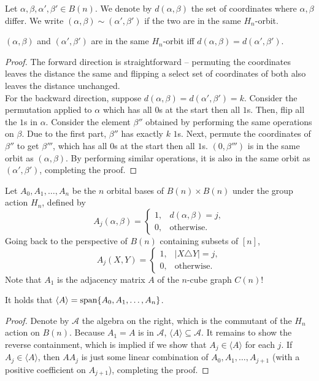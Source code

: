 	Let $\alpha,\beta,\alpha',\beta' \in B(n)$. We denote by $d(\alpha,\beta)$ the set of coordinates where $\alpha,\beta$ differ. We write $(\alpha,\beta) \sim (\alpha',\beta')$ if the two are in the same $H_n$-orbit.

	\begin{flem}
		$(\alpha,\beta)$ and $(\alpha',\beta')$ are in the same $H_n$-orbit iff $d(\alpha,\beta) = d(\alpha',\beta')$.
	\end{flem}
	\begin{proof}
		The forward direction is straightforward -- permuting the coordinates leaves the distance the same and flipping a select set of coordinates of both also leaves the distance unchanged.\\
		For the backward direction, suppose $d(\alpha,\beta) = d(\alpha',\beta') = k$. Consider the permutation applied to $\alpha$ which has all $0$s at the start then all $1$s. Then, flip all the $1$s in $\alpha$. Consider the element $\beta''$ obtained by performing the same operations on $\beta$. Due to the first part, $\beta''$ has exactly $k$ $1$s. Next, permute the coordinates of $\beta''$ to get $\beta'''$, which has all $0$s at the start then all $1$s. $(0,\beta''')$ is in the same orbit as $(\alpha,\beta)$. By performing similar operations, it is also in the same orbit as $(\alpha',\beta')$, completing the proof. 
	\end{proof}

	Let $A_0,A_1,\ldots,A_n$ be the $n$ orbital bases of $B(n) \times B(n)$ under the group action $H_n$, defined by
	\[ A_j(\alpha,\beta) = \begin{cases} 1, & d(\alpha,\beta) = j, \\ 0, & \text{otherwise.} \end{cases} \]
	Going back to the perspective of $B(n)$ containing subsets of $[n]$,
	\[ A_j(X,Y) = \begin{cases} 1, & |X\triangle Y| = j, \\ 0, & \text{otherwise.} \end{cases} \]
	Note that $A_1$ is the adjacency matrix $A$ of the $n$-cube graph $C(n)$!
	\begin{fprop}
		\label{prop: ncube-adj-eigenvals}
		It holds that $\langle A\rangle = \operatorname{span}\{A_0,A_1,\ldots,A_n\}$.
	\end{fprop}
	\begin{proof}
		Denote by $\mathcal{A}$ the algebra on the right, which is the commutant of the $H_n$ action on $B(n)$. Because $A_1 = A$ is in $\mathcal{A}$, $\langle A\rangle \subseteq \mathcal{A}$. It remains to show the reverse containment, which is implied if we show that $A_j \in \langle A\rangle$ for each $j$. If $A_j \in \langle A\rangle$, then $AA_j$ is just some linear combination of $A_0,A_1,\ldots,A_{j+1}$ (with a positive coefficient on $A_{j+1}$), completing the proof.
	\end{proof}

